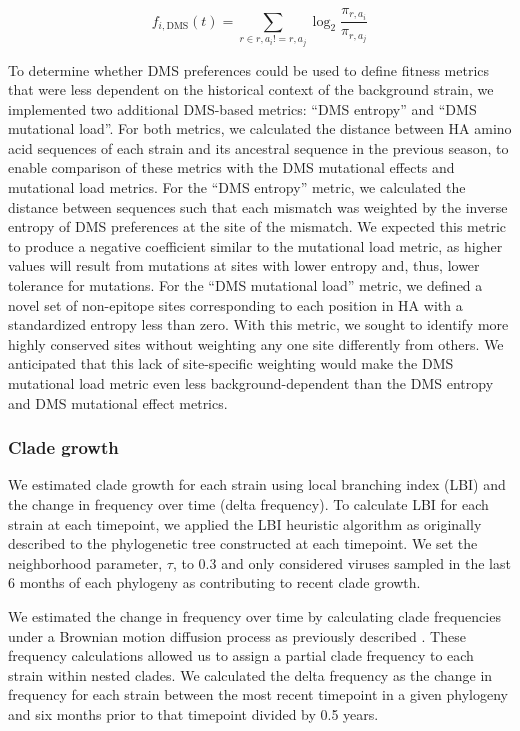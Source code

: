 \begin{equation}
    f_{i,\mathrm{DMS}}(t) = \sum_{r \in r,a_{i} != r,a_{j}}\log_{2}\frac{\pi_{r,a_{i}}}{\pi_{r,a_{j}}}
    \label{equation_mutational_preference}
\end{equation}

To determine whether DMS preferences could be used to define fitness metrics that were less dependent on the historical context of the background strain, we implemented two additional DMS-based metrics: ``DMS entropy'' and ``DMS mutational load''.
For both metrics, we calculated the distance between HA amino acid sequences of each strain and its ancestral sequence in the previous season, to enable comparison of these metrics with the DMS mutational effects and mutational load metrics.
For the ``DMS entropy'' metric, we calculated the distance between sequences such that each mismatch was weighted by the inverse entropy of DMS preferences at the site of the mismatch.
We expected this metric to produce a negative coefficient similar to the mutational load metric, as higher values will result from mutations at sites with lower entropy and, thus, lower tolerance for mutations.
For the ``DMS mutational load'' metric, we defined a novel set of non-epitope sites corresponding to each position in HA with a standardized entropy less than zero.
With this metric, we sought to identify more highly conserved sites without weighting any one site differently from others.
We anticipated that this lack of site-specific weighting would make the DMS mutational load metric even less background-dependent than the DMS entropy and DMS mutational effect metrics.

\subsubsection*{Clade growth}

We estimated clade growth for each strain using local branching index (LBI) and the change in frequency over time (delta frequency).
To calculate LBI for each strain at each timepoint, we applied the LBI heuristic algorithm as originally described \cite{Neher:2014eu} to the phylogenetic tree constructed at each timepoint.
We set the neighborhood parameter, $\tau$, to 0.3 and only considered viruses sampled in the last 6 months of each phylogeny as contributing to recent clade growth.

We estimated the change in frequency over time by calculating clade frequencies under a Brownian motion diffusion process as previously described \cite{Lee2018}.
These frequency calculations allowed us to assign a partial clade frequency to each strain within nested clades.
We calculated the delta frequency as the change in frequency for each strain between the most recent timepoint in a given phylogeny and six months prior to that timepoint divided by 0.5 years.

